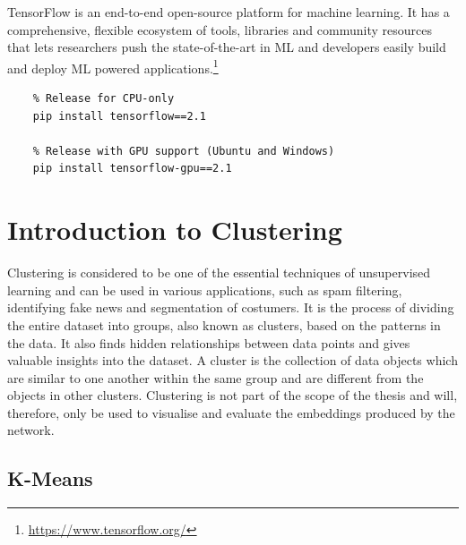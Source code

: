 TensorFlow is an end-to-end open-source platform for machine learning. It has a comprehensive, flexible ecosystem of tools, libraries and community resources that lets researchers push the state-of-the-art in \gls{ML} and developers easily build and deploy \gls{ML} powered applications.\footnote{\url{https://www.tensorflow.org/}}

\begin{verbatim}
    % Release for CPU-only
    pip install tensorflow==2.1
    
    % Release with GPU support (Ubuntu and Windows)
    pip install tensorflow-gpu==2.1 
\end{verbatim}

\section{Introduction to Clustering}
\label{sec:Intro-Clustering}

Clustering is considered to be one of the essential techniques of unsupervised learning and can be used in various applications, such as spam filtering, identifying fake news and segmentation of costumers. 
\newline
\newline
It is the process of dividing the entire dataset into groups, also known as clusters, based on the patterns in the data. It also finds hidden relationships between data points and gives valuable insights into the dataset. A cluster is the collection of data objects which are similar to one another within the same group and are different from the objects in other clusters.
\newline
\newline
Clustering is not part of the scope of the thesis and will, therefore, only be used to visualise and evaluate the embeddings produced by the network.

\subsection{K-Means}
\label{sub:K-Means}

